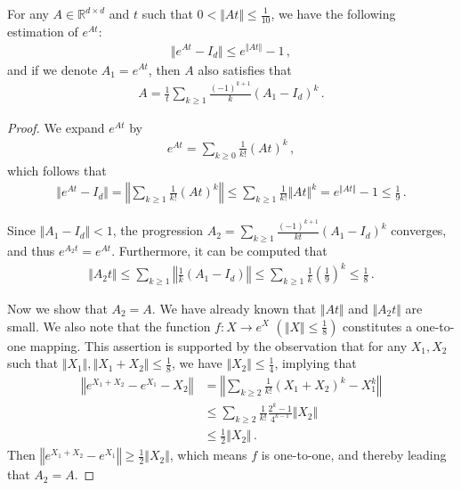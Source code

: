 \documentclass[10pt,a4paper]{amsart}
\begin{document}
\begin{lemma}\label{lem:matrix inverse}
For any $A\in\mathbb{R}^{d\times d}$ and $t$ such that $0<\Vert At\Vert \leq \frac{1}{10}$, we have the following estimation of $e^{At}$:
\begin{align*}
    \Vert e^{At}-I_{d}\Vert \leq e^{\Vert At\Vert }-1\,,
\end{align*}
and if we denote $A_{1}=e^{At}$, then $A$ also satisfies that 
\begin{align*}
A=\frac{1}{t}\sum_{k\geq 1}\frac{(-1)^{k+1}}{k}(A_{1}-I_{d})^{k}\,.
\end{align*}

\end{lemma}

\begin{proof}
We expand $e^{At}$ by
\begin{align*}
    e^{At}=\sum_{k\geq 0}\frac{1}{k!}(At)^{k}\,,
\end{align*}
which follows that
\begin{align*}
    \Vert e^{At}-I_{d}\Vert =\left\Vert\sum_{k\geq 1}\frac{1}{k!}(At)^{k}\right\Vert\leq \sum_{k\geq 1}\frac{1}{k!}\Vert At\Vert ^{k}= e^{\Vert At\Vert }-1\leq \frac{1}{9}\,.
\end{align*}

Since $\Vert A_{1}-I_{d}\Vert <1$, the progression $A_{2}=\sum_{k\geq 1}\frac{(-1)^{k+1}}{kt}(A_{1}-I_{d})^{k}$ converges, and thus 
$e^{A_{2}t}=e^{At}$. Furthermore, it can be computed that
\begin{align*}
\Vert A_{2}t\Vert \leq \sum_{k\geq 1}\left\Vert \frac{1}{k}(A_{1}-I_{d})\right\Vert\leq \sum_{k\geq 1}\frac{1}{k}(\frac{1}{9})^{k}\leq \frac{1}{8}\,.
\end{align*}

Now we show that $A_{2}=A$. We have already known that $\Vert At\Vert $ and $\Vert A_{2}t\Vert $ are small. We also note that the function $f:X\to e^{X}$ $\left( \Vert X\Vert \leq \frac{1}{8}\right)$ constitutes a one-to-one mapping. This assertion is supported by the observation that for any  $X_{1},X_{2}$ such that $\Vert X_{1}\Vert ,\Vert X_{1}+X_{2}\Vert \leq\frac{1}{8}$, we have $\Vert X_{2}\Vert \leq \frac{1}{4}$, implying that 
\begin{align}\label{error of exponential}
\left\Vert e^{X_{1}+X_{2}}-e^{X_{1}}-X_{2}\right\Vert&=\left\Vert\sum_{k\geq 2}\frac{1}{k!}(X_{1}+X_{2})^{k}-X_{1}^{k}\right\Vert\\
&\leq\sum_{k\geq 2}\frac{1}{k!}\frac{2^{k}-1}{4^{k-1}}\Vert X_{2}\Vert \\
&\leq \frac{1}{2}\Vert X_{2}\Vert \,.
\end{align}
Then $\left\Vert e^{X_{1}+X_{2}}-e^{X_{1}}\right\Vert \geq \frac{1}{2}\Vert X_{2}\Vert $, which means $f$ is one-to-one, and thereby leading that $A_{2}=A$.

\end{proof}
\end{document}
